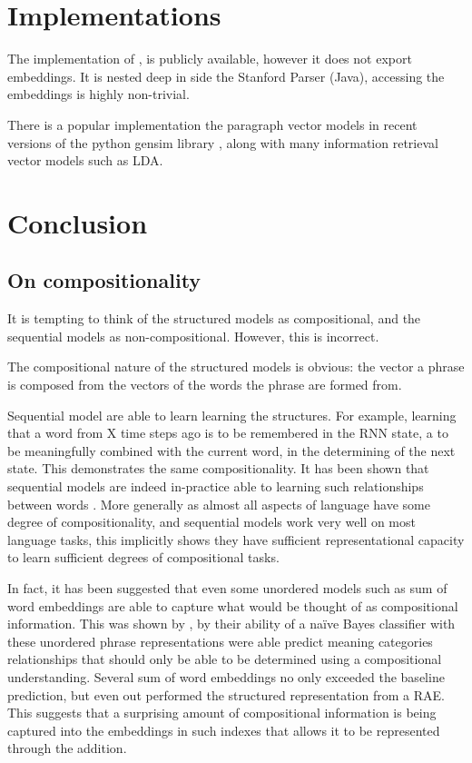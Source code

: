 \documentclass[12pt,parskip]{komatufte}
\begin{document}



\section{Implementations}

The implementation of , is publicly available,
however it does not export embeddings.
It is nested deep in side the Stanford Parser (Java), accessing the embeddings is highly non-trivial.

There is a popular implementation the paragraph vector models in recent versions of the python gensim library , along with many information retrieval vector models such as LDA.


\section{Conclusion}

\subsection{On compositionality}
 

It is tempting to think of the structured models as compositional,
and the sequential models as non-compositional.
However, this is incorrect.

The compositional nature of the structured models is obvious:
the vector a phrase is composed from the vectors of the words the phrase are formed from.

Sequential model are able to learn learning the structures.
For example, learning that a word from X time steps ago is to be remembered in the RNN state, a to be meaningfully combined with the current word, in the determining of the next state.
This demonstrates the same compositionality.
It has been shown that sequential models are indeed in-practice able to learning such relationships between words .
More generally as almost all aspects of language have some degree of compositionality, and sequential models work very well on most language tasks, this implicitly shows they have sufficient representational capacity to learn sufficient degrees of compositional tasks.


In fact, it has been suggested that even some unordered models such as sum of word embeddings are able to capture what would be thought of as compositional information.
This was shown by \textcite{RitterPosition}, by their ability of a na\"ive Bayes classifier with these unordered phrase representations were able predict meaning categories relationships that should only be able to be determined using a compositional understanding.
Several  sum of word embeddings no only exceeded the baseline prediction, but even out performed the structured representation from a RAE.
This suggests that a surprising amount of compositional information is being captured into the embeddings in such indexes that allows it to be represented through the addition.
\end{document}
